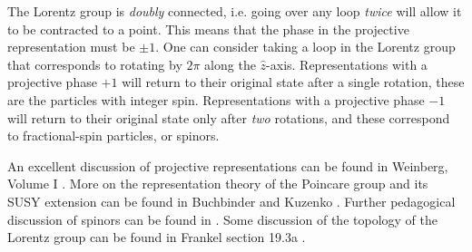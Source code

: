 \documentclass[12pt]{article}
\numberwithin{equation}{section}    %
\begin{document}
The Lorentz group is \textit{doubly} connected, i.e. going over any loop \textit{twice} will allow it to be contracted to a point. This means that the phase in the projective representation must be $\pm 1$. One can consider taking a loop in the Lorentz group that corresponds to rotating by $2\pi$ along the $\hat z$-axis. Representations with a projective phase $+1$ will return to their original state after a single rotation, these are the particles with integer spin. Representations with a projective phase $-1$ will return to their original state only after \textit{two} rotations, and these correspond to fractional-spin particles, or spinors. 
	
An excellent discussion of projective representations can be found in Weinberg, Volume I \cite{Weinberg:1995mt}. 
	More on the representation theory of the Poincare group and its SUSY extension can be found in Buchbinder and Kuzenko \cite{Buchbinder:1998qv}. Further pedagogical discussion of spinors can be found in \cite{spinorspanner}. Some discussion of the topology of the Lorentz group can be found in Frankel section 19.3a \cite{Frankel:2004}.
\end{document}
